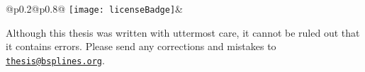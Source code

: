 {  \begin{tabular}{%
    @{}p{0.2\textwidth}@{}p{0.8\textwidth}@{}%
  }
    \texttt{[image: licenseBadge]}&
  \end{tabular}
  
  \vspace{1em}
  
  Although this thesis was written with uttermost care,
  it cannot be ruled out that it contains errors.
  Please send any corrections and mistakes to
  \href{mailto:thesis@bsplines.org}{\texttt{thesis@bsplines.org}}.
}

\cleardoublepage
